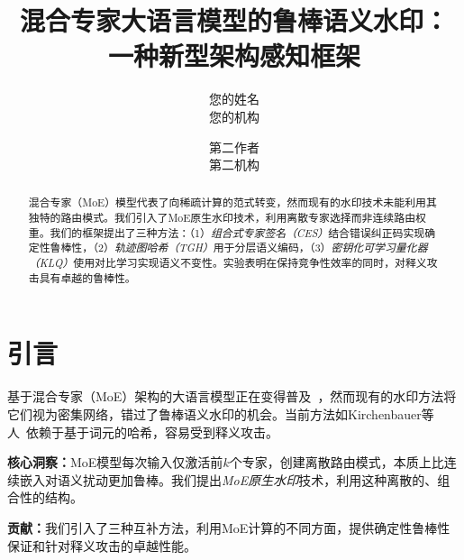 \documentclass[letterpaper,twocolumn,10pt]{article}
\begin{document}

\date{}

\title{\Large \bf 混合专家大语言模型的鲁棒语义水印：\\
  一种新型架构感知框架}

\author{
{\rm 您的姓名}\\
您的机构
\and
{\rm 第二作者}\\
第二机构
} %

\maketitle

\begin{abstract}
混合专家（MoE）模型代表了向稀疏计算的范式转变，然而现有的水印技术未能利用其独特的路由模式。我们引入了MoE原生水印技术，利用离散专家选择而非连续路由权重。我们的框架提出了三种方法：（1）\textit{组合式专家签名（CES）}结合错误纠正码实现确定性鲁棒性，（2）\textit{轨迹图哈希（TGH）}用于分层语义编码，（3）\textit{密钥化可学习量化器（KLQ）}使用对比学习实现语义不变性。实验表明在保持竞争性效率的同时，对释义攻击具有卓越的鲁棒性。
\end{abstract}

\section{引言}

基于混合专家（MoE）架构的大语言模型正在变得普及~\cite{jiang2024mixtral}，然而现有的水印方法将它们视为密集网络，错过了鲁棒语义水印的机会。当前方法如Kirchenbauer等人~\cite{kirchenbauer2023watermark}依赖于基于词元的哈希，容易受到释义攻击。

\textbf{核心洞察：}MoE模型每次输入仅激活前$k$个专家，创建离散路由模式，本质上比连续嵌入对语义扰动更加鲁棒。我们提出\textit{MoE原生水印}技术，利用这种离散的、组合性的结构。

\textbf{贡献：}我们引入了三种互补方法，利用MoE计算的不同方面，提供确定性鲁棒性保证和针对释义攻击的卓越性能。
\end{document}
